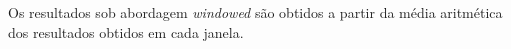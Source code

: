 Os resultados sob abordagem \textit{windowed} são obtidos a partir da média
aritmética dos resultados obtidos em cada janela.



